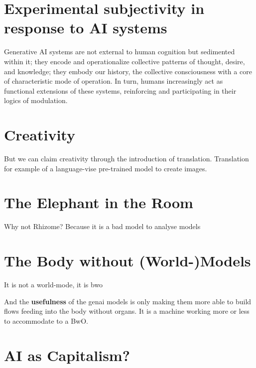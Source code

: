 \section{Experimental subjectivity in response to AI systems}

Generative AI systems are not external to human cognition but sedimented within it; they encode and operationalize collective patterns of thought, desire, and knowledge; they embody our history, the collective consciousness with a core of characteristic mode of operation. In turn, humans increasingly act as functional extensions of these systems, reinforcing and participating in their logics of modulation.

\section{Creativity}
But we can claim creativity through the introduction of translation.
Translation for example of a language-vise pre-trained model to create images.



\section{The Elephant in the Room}
Why not Rhizome? Because it is a bad model to analyse models

\section{The Body without (World-)Models}
It is not a world-mode, it is \gls{bwo}


And the \textbf{usefulness} of the \gls{genai} models is only making them more
able to build flows feeding into the body without organs. It is a machine
working more or less to accommodate to a BwO.

\section{AI as Capitalism?}




